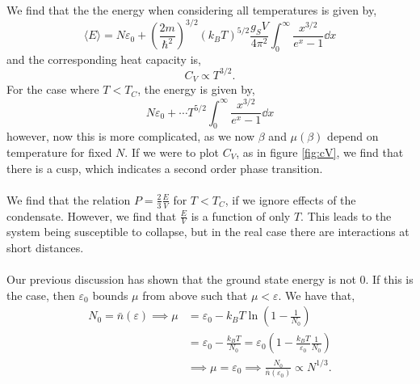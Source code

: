 \documentclass{book}
\begin{document}
We find that the the energy when considering all temperatures is given by,
\begin{equation}
	\langle E \rangle = N\varepsilon_0 + \left(\frac{2m}{\hbar^2}\right)^{3/2}(k_BT)^{5/2}\frac{g_SV}{4\pi^2}\int_0^{\infty}\frac{x^{3/2}}{e^x -1}\dd{x}
\end{equation}
and the corresponding heat capacity is,
\begin{equation}
	C_V \propto T^{3/2}.
\end{equation}
For the case where $T < T_C$, the energy is given by,
\begin{equation}
	N\varepsilon_0 + \cdots T^{5/2}\int_0^{\infty}\frac{x^{3/2}}{e^x -1}\dd{x}
\end{equation}
however, now this is more complicated, as we now $\beta$ and $\mu(\beta)$ depend on temperature for fixed $N$. If we were to plot $C_V$, as in figure \ref{fig:cV}, we find that there is a cusp, which indicates a second order phase transition. 
\\\\
We find that the relation $P = \frac{2}{3}\frac{E}{V}$ for $T < T_C$, if we ignore effects of the condensate. However, we find that $\frac{E}{V}$ is a function of only $T$. This leads to the system being susceptible to collapse, but in the real case there are interactions at short distances. 
\\\\
Our previous discussion has shown that the ground state energy is not 0. If this is the case, then $\varepsilon_0$ bounds $\mu$ from above such that $\mu < \varepsilon$. We have that,
\begin{equation}
	\begin{split}
	N_0 = \bar{n}(\varepsilon) \implies \mu & = \varepsilon_0 - k_BT\ln\left(1 - \frac{1}{N_0}\right) \\
	& = \varepsilon_0 - \frac{k_BT}{N_0} = \varepsilon_0 \left(1 - \frac{k_BT}{\varepsilon_0}\frac{1}{N_0}\right) \\
	& \implies \mu = \varepsilon_0 \implies \frac{N_0}{\bar{n}(\varepsilon_0)} \propto N^{1/3}.
	\end{split}
\end{equation}
\end{document}
